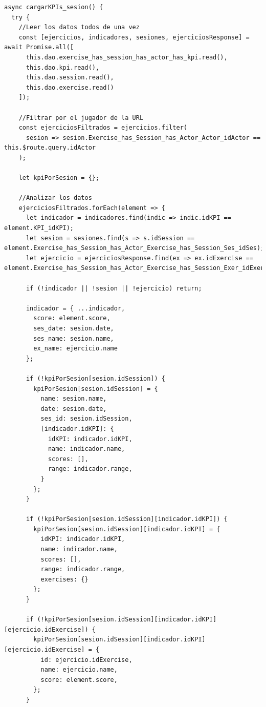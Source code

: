 \begin{lstlisting}[style=Javascript-color, caption={Carga de KPIs por sesión},label=Javascript-color_code_kpis_ses]
async cargarKPIs_sesion() {
  try {
    //Leer los datos todos de una vez
    const [ejercicios, indicadores, sesiones, ejerciciosResponse] = await Promise.all([
      this.dao.exercise_has_session_has_actor_has_kpi.read(),
      this.dao.kpi.read(),
      this.dao.session.read(),
      this.dao.exercise.read()
    ]);

    //Filtrar por el jugador de la URL
    const ejerciciosFiltrados = ejercicios.filter(
      sesion => sesion.Exercise_has_Session_has_Actor_Actor_idActor == this.$route.query.idActor
    );

    let kpiPorSesion = {};

    //Analizar los datos
    ejerciciosFiltrados.forEach(element => {
      let indicador = indicadores.find(indic => indic.idKPI == element.KPI_idKPI);
      let sesion = sesiones.find(s => s.idSession == element.Exercise_has_Session_has_Actor_Exercise_has_Session_Ses_idSes);
      let ejercicio = ejerciciosResponse.find(ex => ex.idExercise == element.Exercise_has_Session_has_Actor_Exercise_has_Session_Exer_idExer);

      if (!indicador || !sesion || !ejercicio) return;

      indicador = { ...indicador,
        score: element.score,
        ses_date: sesion.date,
        ses_name: sesion.name,
        ex_name: ejercicio.name
      };

      if (!kpiPorSesion[sesion.idSession]) {
        kpiPorSesion[sesion.idSession] = {
          name: sesion.name,
          date: sesion.date,
          ses_id: sesion.idSession,
          [indicador.idKPI]: {
            idKPI: indicador.idKPI,
            name: indicador.name,
            scores: [],
            range: indicador.range,
          }
        };
      }

      if (!kpiPorSesion[sesion.idSession][indicador.idKPI]) {
        kpiPorSesion[sesion.idSession][indicador.idKPI] = {
          idKPI: indicador.idKPI,
          name: indicador.name,
          scores: [],
          range: indicador.range,
          exercises: {}
        };
      }

      if (!kpiPorSesion[sesion.idSession][indicador.idKPI][ejercicio.idExercise]) {
        kpiPorSesion[sesion.idSession][indicador.idKPI][ejercicio.idExercise] = {
          id: ejercicio.idExercise,
          name: ejercicio.name,
          score: element.score,
        };
      }


\end{lstlisting}
